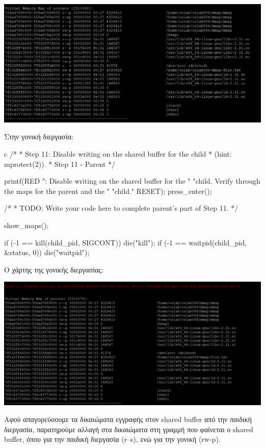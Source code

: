 \documentclass[12pt]{article}
\begin{document}
\centerline{\includegraphics[width=1\textwidth]{3_1_11b.png}}

Στην γονική διεργασία:

\begin{codeless}{c}
    /*
    * Step 11: Disable writing on the shared buffer for the child
    * (hint: mprotect(2)).
    * Step 11 - Parent
    */
   
   printf(RED ": Disable writing on the shared buffer for the "
       "child. Verify through the maps for the parent and the "
       "child.\n" RESET);
   press_enter();

   /*
    * TODO: Write your code here to complete parent's part of Step 11.
    */
   
   show_maps();
   
   if (-1 == kill(child_pid, SIGCONT))
   {
       die("kill");
   }
   if (-1 == waitpid(child_pid, &status, 0))
   {
       die("waitpid");
   }
\end{codeless}

Ο χάρτης της γονικής διεργασίας:

\centerline{\includegraphics[width=1\textwidth]{3_1_11.png}}

Αφού απαγορεύσουμε τα δικαιώματα εγγραφής στον shared buffer από την παιδική διεργασία, 
παρατηρούμε αλλαγή στα δικαιώματα στη γραμμή που φαίνεται ο shared buffer, όπου για 
την παιδική διεργασία (r--s), ενώ για την γονική (rw-p).
\end{document}
